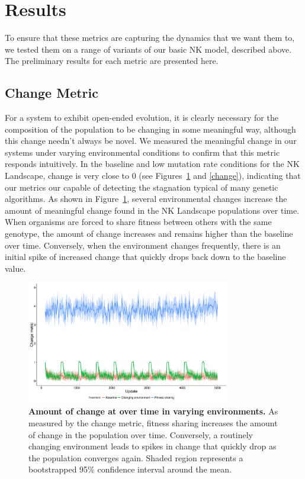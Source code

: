 \documentclass[letterpaper]{article}
\begin{document}
\section{Results}
To ensure that these metrics are capturing the dynamics that we want them to, we tested them on a range of variants of our basic NK model, described above. The preliminary results for each metric are presented here.

\subsection{Change Metric}
For a system to exhibit open-ended evolution, it is clearly necessary for the composition of the population to be changing in some meaningful way, although this change needn't always be novel. We measured the meaningful change in our systems under varying environmental conditions to confirm that this metric responds intuitively. In the baseline and low mutation rate conditions for the NK Landscape, change is very close to 0 (see Figures~\ref{change_time} and \ref{change}), indicating that our metrics our capable of detecting the stagnation typical of many genetic algorithms. As shown in Figure~\ref{change_time}, several environmental changes increase the amount of meaningful change found in the NK Landscape populations over time. When organisms are forced to share fitness between others with the same genotype, the amount of change increases and remains higher than the baseline over time. Conversely, when the environment changes frequently, there is an initial spike of increased change that quickly drops back down to the baseline value.

\begin{figure}
\includegraphics[width=3.5in]{figs/change_changing_environments.png}
\caption{\textbf{Amount of change at over time in varying environments.} As measured by the change metric, fitness sharing increases the amount of change in the population over time. Conversely, a routinely changing environment leads to spikes in change that quickly drop as the population converges again. Shaded region represents a bootstrapped 95\% confidence interval around the mean.}
\label{change_time}
\end{figure}
\end{document}
